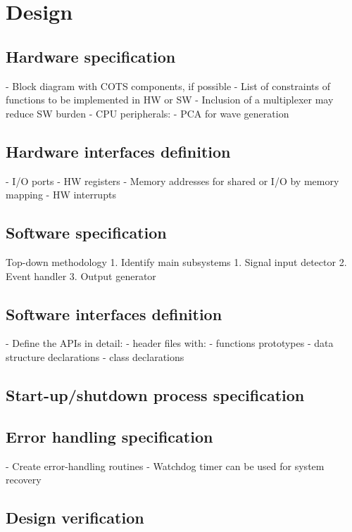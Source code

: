 \chapter{Design}
\label{ch:design}

\section{Hardware specification}
\label{sec:hw-specs}
- Block diagram with COTS components, if possible
- List of constraints of functions to be implemented in HW or SW
  - Inclusion of a multiplexer may reduce SW burden
  - CPU peripherals:
    - PCA for wave generation
    
\section{Hardware interfaces definition}
\label{sec:hw-interf-def}
- I/O ports
- HW registers
- Memory addresses for shared or I/O by memory mapping
- HW interrupts

\section{Software specification}
\label{sec:sw-specs}
Top-down methodology
1. Identify main subsystems
   1. Signal input detector
   2. Event handler
   3. Output generator

\section{Software interfaces definition}
\label{sec:sw-interf-def}
- Define the APIs in detail:
  - header files with:
    - functions prototypes
    - data structure declarations
    - class declarations

\section{Start-up/shutdown process specification}
\label{sec:startup-shutdown}

\section{Error handling specification}
\label{sec:error-handling-specification}
- Create error-handling routines
- Watchdog timer can be used for system recovery

\section{Design verification}
\label{sec:design-verification}